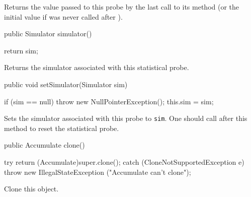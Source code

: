 \begin{tabb}  Returns the value passed to this probe by the last call
   to its  method (or the initial value if
    was never called after ).
\end{tabb}
\begin{htmlonly}
\end{htmlonly}
\begin{code}

   public Simulator simulator() \begin{hide} {
      return sim;
   } \end{hide}
\end{code}
 \begin{tabb}   Returns the simulator associated with this statistical probe.
 \end{tabb}
\begin{htmlonly}
\end{htmlonly}
\begin{code}

   public void setSimulator(Simulator sim) \begin{hide} {
       if (sim == null)
          throw new NullPointerException();
      this.sim = sim;
   } \end{hide}
\end{code}
 \begin{tabb}   Sets the simulator associated with this probe to \texttt{sim}.
   One should call  after this method to reset the statistical probe.
 \end{tabb}
\begin{htmlonly}
\end{htmlonly}
\begin{code}

   public Accumulate clone()\begin{hide} {
      try {
         return (Accumulate)super.clone();
      } catch (CloneNotSupportedException e) {
         throw new IllegalStateException ("Accumulate can't clone");
      }
   }\end{hide}
\end{code}
\begin{tabb} Clone this object.
\end{tabb}
\begin{code}\begin{hide}
}\end{hide}
\end{code}
